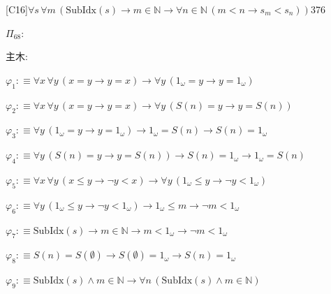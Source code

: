 \begin{fullproof}{[C16]}{$\forall s\,\forall m\,(\mathrm{SubIdx}(s) \to m \in \mathbb{N} \to \forall n \in \mathbb{N}\,(m < n \to s_{m} < s_{n}))$}{376}
\begin{ptree}
\end{ptree}
\noindent$\Pi_{68}$:
\begin{ptree}
\noLine
{}
\end{ptree}
\noindent 主木:
\begin{ptree}
\noLine
{}
\end{ptree}
\begin{abbrevlist}
\item $\varphi_{1} :\equiv \forall x\,\forall y\,(x = y \to y = x) \to \forall y\,(1_{\omega} = y \to y = 1_{\omega})$
\item $\varphi_{2} :\equiv \forall x\,\forall y\,(x = y \to y = x) \to \forall y\,(S(n) = y \to y = S(n))$
\item $\varphi_{3} :\equiv \forall y\,(1_{\omega} = y \to y = 1_{\omega}) \to 1_{\omega} = S(n) \to S(n) = 1_{\omega}$
\item $\varphi_{4} :\equiv \forall y\,(S(n) = y \to y = S(n)) \to S(n) = 1_{\omega} \to 1_{\omega} = S(n)$
\item $\varphi_{5} :\equiv \forall x\,\forall y\,(x \leq y \to \neg y < x) \to \forall y\,(1_{\omega} \leq y \to \neg y < 1_{\omega})$
\item $\varphi_{6} :\equiv \forall y\,(1_{\omega} \leq y \to \neg y < 1_{\omega}) \to 1_{\omega} \leq m \to \neg m < 1_{\omega}$
\item $\varphi_{7} :\equiv \mathrm{SubIdx}(s) \to m \in \mathbb{N} \to m < 1_{\omega} \to \neg m < 1_{\omega}$
\item $\varphi_{8} :\equiv S(n) = S(\emptyset) \to S(\emptyset) = 1_{\omega} \to S(n) = 1_{\omega}$
\item $\varphi_{9} :\equiv \mathrm{SubIdx}(s) \land m \in \mathbb{N} \to \forall n\,(\mathrm{SubIdx}(s) \land m \in \mathbb{N})$

\end{abbrevlist}
\end{fullproof}
